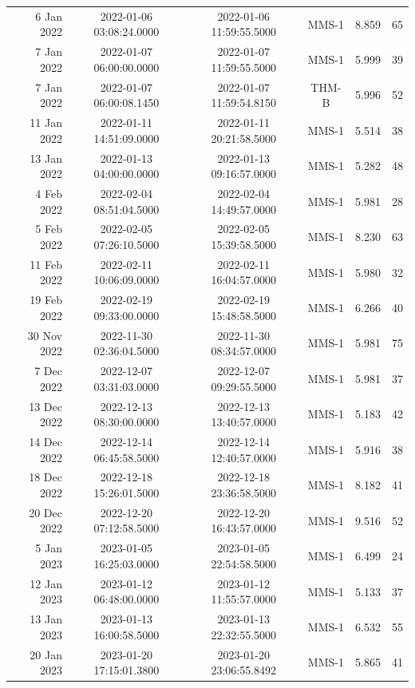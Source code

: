 \begin{longtable}{r|ccccc}
6 Jan 2022     &  2022-01-06 03:08:24.0000 &  2022-01-06 11:59:55.5000 &  MMS-1 &    8.859 &     65 \\
7 Jan 2022     &  2022-01-07 06:00:00.0000 &  2022-01-07 11:59:55.5000 &  MMS-1 &    5.999 &     39 \\
7 Jan 2022     &  2022-01-07 06:00:08.1450 &  2022-01-07 11:59:54.8150 &  THM-B &    5.996 &     52 \\
11 Jan 2022    &  2022-01-11 14:51:09.0000 &  2022-01-11 20:21:58.5000 &  MMS-1 &    5.514 &     38 \\
13 Jan 2022    &  2022-01-13 04:00:00.0000 &  2022-01-13 09:16:57.0000 &  MMS-1 &    5.282 &     48 \\
4 Feb 2022     &  2022-02-04 08:51:04.5000 &  2022-02-04 14:49:57.0000 &  MMS-1 &    5.981 &     28 \\
5 Feb 2022     &  2022-02-05 07:26:10.5000 &  2022-02-05 15:39:58.5000 &  MMS-1 &    8.230 &     63 \\
11 Feb 2022    &  2022-02-11 10:06:09.0000 &  2022-02-11 16:04:57.0000 &  MMS-1 &    5.980 &     32 \\
19 Feb 2022    &  2022-02-19 09:33:00.0000 &  2022-02-19 15:48:58.5000 &  MMS-1 &    6.266 &     40 \\
30 Nov 2022    &  2022-11-30 02:36:04.5000 &  2022-11-30 08:34:57.0000 &  MMS-1 &    5.981 &     75 \\
7 Dec 2022     &  2022-12-07 03:31:03.0000 &  2022-12-07 09:29:55.5000 &  MMS-1 &    5.981 &     37 \\
13 Dec 2022    &  2022-12-13 08:30:00.0000 &  2022-12-13 13:40:57.0000 &  MMS-1 &    5.183 &     42 \\
14 Dec 2022    &  2022-12-14 06:45:58.5000 &  2022-12-14 12:40:57.0000 &  MMS-1 &    5.916 &     38 \\
18 Dec 2022    &  2022-12-18 15:26:01.5000 &  2022-12-18 23:36:58.5000 &  MMS-1 &    8.182 &     41 \\
20 Dec 2022    &  2022-12-20 07:12:58.5000 &  2022-12-20 16:43:57.0000 &  MMS-1 &    9.516 &     52 \\
5 Jan 2023     &  2023-01-05 16:25:03.0000 &  2023-01-05 22:54:58.5000 &  MMS-1 &    6.499 &     24 \\
12 Jan 2023    &  2023-01-12 06:48:00.0000 &  2023-01-12 11:55:57.0000 &  MMS-1 &    5.133 &     37 \\
13 Jan 2023    &  2023-01-13 16:00:58.5000 &  2023-01-13 22:32:55.5000 &  MMS-1 &    6.532 &     55 \\
20 Jan 2023    &  2023-01-20 17:15:01.3800 &  2023-01-20 23:06:55.8492 &  MMS-1 &    5.865 &     41 \\

\end{longtable}
